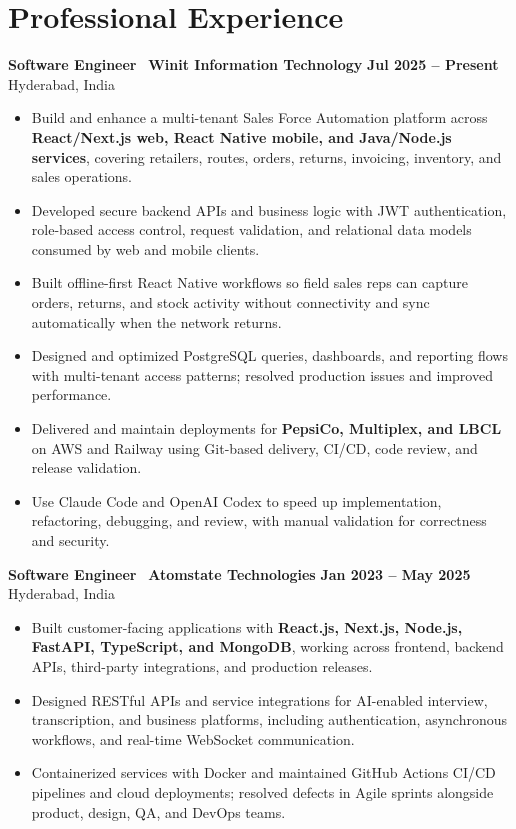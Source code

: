 \documentclass[a4paper,11pt]{article}
\newcommand{\role}[4]{%
  \textbf{#1} \textbar\ \textbf{#2} \hfill \textbf{#4}\\[-1pt]
  {\small #3}\par\vspace{1pt}}
\begin{document}
\section*{Professional Experience}

\role{Software Engineer}{Winit Information Technology}{Hyderabad, India}{Jul 2025 -- Present}
\begin{itemize}
  \item Build and enhance a multi-tenant Sales Force Automation platform across \textbf{React/Next.js web, React Native mobile, and Java/Node.js services}, covering retailers, routes, orders, returns, invoicing, inventory, and sales operations.
  \item Developed secure backend APIs and business logic with JWT authentication, role-based access control, request validation, and relational data models consumed by web and mobile clients.
  \item Built offline-first React Native workflows so field sales reps can capture orders, returns, and stock activity without connectivity and sync automatically when the network returns.
  \item Designed and optimized PostgreSQL queries, dashboards, and reporting flows with multi-tenant access patterns; resolved production issues and improved performance.
  \item Delivered and maintain deployments for \textbf{PepsiCo, Multiplex, and LBCL} on AWS and Railway using Git-based delivery, CI/CD, code review, and release validation.
  \item Use Claude Code and OpenAI Codex to speed up implementation, refactoring, debugging, and review, with manual validation for correctness and security.
\end{itemize}

\role{Software Engineer}{Atomstate Technologies}{Hyderabad, India}{Jan 2023 -- May 2025}
\begin{itemize}
  \item Built customer-facing applications with \textbf{React.js, Next.js, Node.js, FastAPI, TypeScript, and MongoDB}, working across frontend, backend APIs, third-party integrations, and production releases.
  \item Designed RESTful APIs and service integrations for AI-enabled interview, transcription, and business platforms, including authentication, asynchronous workflows, and real-time WebSocket communication.
  \item Containerized services with Docker and maintained GitHub Actions CI/CD pipelines and cloud deployments; resolved defects in Agile sprints alongside product, design, QA, and DevOps teams.
\end{itemize}
\end{document}
